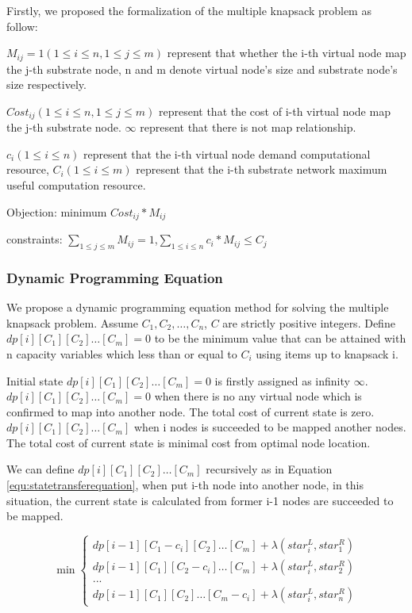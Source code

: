 Firstly, we proposed the formalization of the multiple knapsack problem as follow:

$M_{ij}=1(1\leq i\leq n,1 \leq j \leq m)$ represent that whether the i-th virtual node map the j-th substrate node, n and m denote virtual node's size and substrate node's size respectively.

$Cost_{ij}(1\leq i\leq n,1 \leq j \leq m)$ represent that the cost of i-th virtual node map the j-th substrate node. $\infty$ represent that there is not map relationship.

$c_i(1\leq i\leq n)$ represent that the i-th virtual node demand computational resource, $C_i(1\leq i\leq m)$ represent that the i-th substrate network maximum useful computation resource.

Objection: minimum $Cost_{ij}*M_{ij}$

constraints: $\sum\limits_{1\leq j\leq m} M_{ij}=1$,$\sum\limits_{1\leq i\leq n} c_i*M_{ij}\leq C_j$

\subsubsection{Dynamic Programming Equation}
\label{lab:DynamicProgrammingEquation}
We propose a dynamic programming equation method for solving the multiple knapsack problem. Assume $C_1,C_2,\ldots,C_n$, $C$ are strictly positive integers. Define $dp[i][{C_1}][{C_2}] \ldots [{C_m}]=0$ to be the minimum value that can be attained with n capacity variables  which less than or equal to $C_i$ using items up to knapsack i.

Initial state $dp[i][{C_1}][{C_2}] \ldots [{C_m}]=0$ is firstly assigned as infinity $\infty$. $dp[i][{C_1}][{C_2}] \ldots [{C_m}]=0$ when there is no any virtual node which is confirmed to map into another node. The total cost of current state is zero. $dp[i][{C_1}][{C_2}] \ldots [{C_m}]$ when  i nodes is succeeded to be mapped another nodes. The total cost of current state is minimal cost from optimal node location.

We can define $dp[i][{C_1}][{C_2}] \ldots [{C_m}]$ recursively as in Equation \ref{equ:statetransferequation}, when put i-th node into another node, in this situation, the current state is calculated from former i-1 nodes are succeeded to be mapped.

\begin{equation}
\label{equ:statetransferequation}

\min \left\{ \begin{array}{l}
dp[i - 1][{C_1-c_i}][{C_2}] \ldots [{C_m}]+\lambda(star^L_i,star^R_1)\\
dp[i - 1][{C_1}][{C_2-c_i}] \ldots [{C_m}]+\lambda(star^L_i,star^R_2)\\
...\\
dp[i - 1][{C_1}][{C_2}] \ldots [{C_m-c_i}]+\lambda(star^L_i,star^R_n)
\end{array} \right.

\end{equation}

